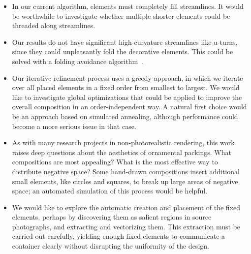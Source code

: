 \begin{itemize}

\item In our current algorithm, elements must completely fill streamlines.
It would be worthwhile to investigate whether multiple shorter elements
could be threaded along streamlines.

\item Our results do not have significant high-curvature streamlines like u-turns, since they could unpleasantly fold the decorative elements. This could be solved with a folding avoidance algorithm~\cite{Asente2010}.


\item Our iterative refinement process uses a greedy approach, in which we 
iterate over all placed elements in a fixed order from smallest to largest.
We would like to investigate global optimizations
that could be applied to improve the overall composition in an 
order-independent way.  A natural first choice would be an approach based
on simulated annealing, although performance could become a more serious
issue in that case.

\item {} As with many research projects in non-photorealistic rendering, this
work raises deep questions about the aesthetics of ornamental packings.
What compositions are most appealing?  What is the most effective
way to distribute
negative space?  Some hand-drawn compositions insert additional small elements,
like circles and squares, to break up large areas of negative space;
an automated simulation of this process would be helpful.

\item We would like to explore the automatic creation and placement of 
the fixed elements, perhaps by discovering them as salient regions 
in source photographs, and extracting and vectorizing them.  This 
extraction must be carried out carefully, yielding enough fixed elements
to communicate a container clearly without disrupting the uniformity of
the design.

\end{itemize}
